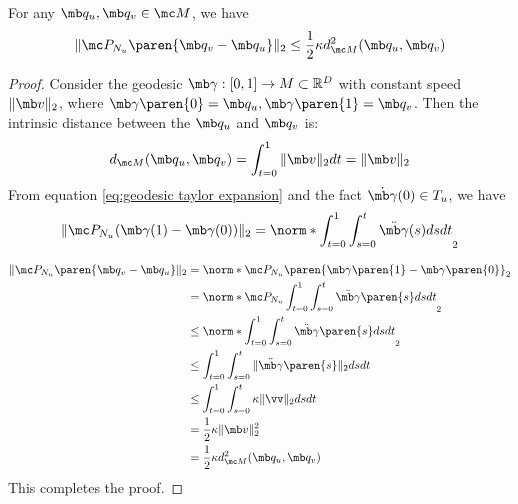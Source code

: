 \begin{lemma}\label{lem:bound norm edge term}
    For any $\mb q_u, \mb q_v \in \mc M$, we have
    \begin{equation}
        \| \mc P_{N_u} \paren{\mb q_v - \mb q_u} \|_2
        \leq \frac{1}{2} \kappa d_{\mc M}^2(\mb q_u, \mb q_v)
    \end{equation}
\end{lemma}
\begin{proof}
    Consider the geodesic $\mb \gamma:[0,1] \rightarrow M \subset \mathbb{R}^D$ with constant speed $\| \mb v\|_2$, where $\mb \gamma \paren{0} = \mb q_u, \mb \gamma \paren{1} = \mb q_v$.
    Then the intrinsic distance between the $\mb q_u$ and $\mb q_v$ is:
    \begin{equation}
            d_{\mc M}(\mb q_u, \mb q_v)
            = \int_{t=0}^1 \| \mb v\|_2 dt = \| \mb v\|_2
    \end{equation}
From equation \eqref{eq:geodesic taylor expansion} and the fact $\dot{\mb\gamma}(0) \in T_{u}$, we have
\begin{equation}
    \| \mc P_{N_u }(\mb\gamma(1) - \mb\gamma(0))\|_2
    = \norm*{ \int_{t=0}^1 \int_{s=0}^t \ddot{\mb\gamma}(s) ds dt }_2
\end{equation}


\begin{equation}
    \begin{aligned}
        \| \mc P_{N_u} \paren{\mb q_v - \mb q_u} \|_2
        &= \norm*{ \mc P_{N_u} \paren{\mb \gamma \paren{1} - \mb \gamma \paren{0}} }_2\\
        &= \norm*{  \mc P_{N_u} \int_{t=0}^1 \int_{s=0}^t \Ddot{\mb \gamma} \paren{s}  ds dt }_2\\
        & \leq \norm*{ \int_{t=0}^1 \int_{s=0}^t \Ddot{\mb \gamma} \paren{s}  ds dt }_2\\
        & \leq \int_{t=0}^1 \int_{s=0}^t \| \Ddot{\mb \gamma} \paren{s} \|_2  ds dt\\
        & \leq \int_{t=0}^1 \int_{s=0}^t \kappa \| \vv\|_2 ds dt\\
        &= \frac{1}{2} \kappa \|\mb v\|_2^2\\
        &= \frac{1}{2} \kappa d^2_{\mc M}(\mb q_u, \mb q_v)
    \end{aligned}
\end{equation}
This completes the proof.
\end{proof}

